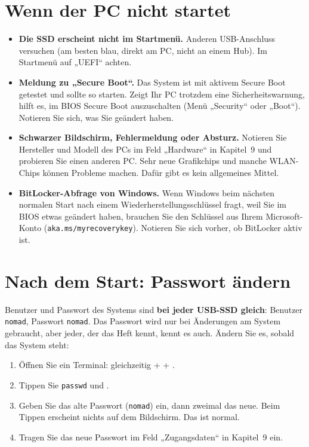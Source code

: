 \section{Wenn der PC nicht startet}
\begin{itemize}[leftmargin=1.5em,itemsep=3pt]
\item \textbf{Die SSD erscheint nicht im Startmenü.} Anderen USB-Anschluss versuchen (am besten blau, direkt am PC, nicht an einem Hub). Im Startmenü auf „UEFI“ achten.
\item \textbf{Meldung zu „Secure Boot“.} Das System ist mit aktivem Secure Boot getestet und sollte so starten. Zeigt Ihr PC trotzdem eine Sicherheitswarnung, hilft es, im BIOS Secure Boot auszuschalten (Menü „Security“ oder „Boot“). Notieren Sie sich, was Sie geändert haben.
\item \textbf{Schwarzer Bildschirm, Fehlermeldung oder Absturz.} Notieren Sie Hersteller und Modell des PCs im Feld „Hardware“ in Kapitel~9 und probieren Sie einen anderen PC. Sehr neue Grafikchips und manche WLAN-Chips können Probleme machen. Dafür gibt es kein allgemeines Mittel.
\item \textbf{BitLocker-Abfrage von Windows.} Wenn Windows beim nächsten normalen Start nach einem Wiederherstellungsschlüssel fragt, weil Sie im BIOS etwas geändert haben, brauchen Sie den Schlüssel aus Ihrem Microsoft-Konto (\texttt{aka.ms/myrecoverykey}). Notieren Sie sich vorher, ob BitLocker aktiv ist.
\end{itemize}

\section{Nach dem Start: Passwort ändern}
Benutzer und Passwort des Systems sind \textbf{bei jeder USB-SSD gleich}: Benutzer \texttt{nomad}, Passwort \texttt{nomad}. Das Passwort wird nur bei Änderungen am System gebraucht, aber jeder, der das Heft kennt, kennt es auch. Ändern Sie es, sobald das System steht:
\begin{enumerate}[leftmargin=1.5em,itemsep=3pt]
\item Öffnen Sie ein Terminal: gleichzeitig  +  + .
\item Tippen Sie \texttt{passwd} und .
\item Geben Sie das alte Passwort (\texttt{nomad}) ein, dann zweimal das neue. Beim Tippen erscheint nichts auf dem Bildschirm. Das ist normal.
\item Tragen Sie das neue Passwort im Feld „Zugangsdaten“ in Kapitel~9 ein.
\end{enumerate}
